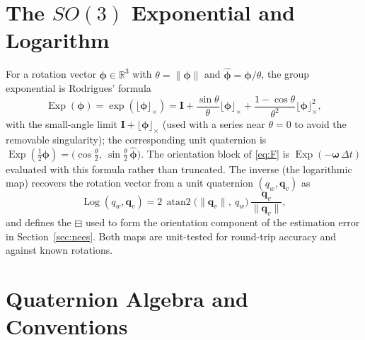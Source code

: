 \documentclass[11pt]{article}
\newcommand{\I}{\mathbf{I}}
\newcommand{\bomega}{\bm{\omega}}
\newcommand{\skewm}[1]{\lfloor #1 \rfloor_\times}
\newcommand{\real}{\mathbb{R}}
\DeclareMathOperator{\Exp}{Exp}
\DeclareMathOperator{\Log}{Log}
\DeclareMathOperator{\atantwo}{atan2}
\begin{document}
\section{The \texorpdfstring{$SO(3)$}{SO(3)} Exponential and Logarithm}
\label{app:so3}

For a rotation vector $\bm{\phi}\in\real^3$ with $\theta=\lVert\bm{\phi}\rVert$ and
$\hat{\bm{\phi}}=\bm{\phi}/\theta$, the group exponential is Rodrigues' formula
\begin{equation}
  \Exp(\bm{\phi}) = \exp(\skewm{\bm{\phi}}) = \I + \frac{\sin\theta}{\theta}\skewm{\bm{\phi}}
  + \frac{1-\cos\theta}{\theta^2}\skewm{\bm{\phi}}^2,
\end{equation}
with the small-angle limit $\I+\skewm{\bm{\phi}}$ (used with a series near $\theta=0$ to avoid the
removable singularity); the corresponding unit quaternion is
$\Exp(\tfrac12\bm{\phi}) = \big(\cos\tfrac{\theta}{2},\ \sin\tfrac{\theta}{2}\,\hat{\bm{\phi}}\big)$.
The orientation block of \eqref{eq:F} is $\Exp(-\bomega\,\Delta t)$ evaluated with this formula rather
than truncated. The inverse (the logarithmic map) recovers the rotation vector from a unit quaternion
$(q_w,\bm{q}_v)$ as
\begin{equation}
  \Log(q_w,\bm q_v) = 2\,\atantwo\!\big(\lVert\bm{q}_v\rVert,\ q_w\big)\,
  \frac{\bm{q}_v}{\lVert\bm{q}_v\rVert},
\end{equation}
and defines the $\boxminus$ used to form the orientation component of the estimation error in
Section~\ref{sec:nees}. Both maps are unit-tested for round-trip accuracy and against known rotations.

\section{Quaternion Algebra and Conventions}
\label{app:quat}
\end{document}
